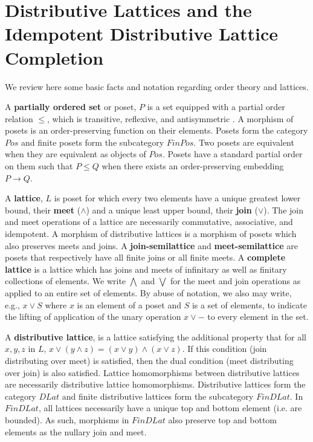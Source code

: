\documentclass[a4paper,USenglish,cleveref, autoref, thm-restate,authorcolumns]{lipics-v2019}
\begin{document}
\section{Distributive Lattices and the Idempotent Distributive Lattice Completion}

We review here some basic facts and notation regarding order theory and lattices.

A \textbf{partially ordered set} or poset, \(P\) is a set equipped with a partial order relation \(\le\), which is transitive, reflexive, and antisymmetric . A morphism of posets is an order-preserving function on their elements. Posets form the category \(Pos\) and finite posets form the subcategory \(FinPos\). Two posets are equivalent when they are equivalent as objects of \(Pos\). Posets have a standard partial order on them such that \(P \le Q\) when there exists an order-preserving embedding \(P \rightarrow Q\).

A \textbf{lattice}, \(L\) is poset for which every two elements have a unique greatest lower bound, their \textbf{meet} (\(\wedge\)) and a unique least upper bound, their \textbf{join} (\(\vee\)). The join and meet operations of a lattice are necessarily commutative, associative, and idempotent. A morphism of distributive lattices is a morphism of posets which also preserves meets and joins. A \textbf{join-semilattice} and \textbf{meet-semilattice} are posets that respectively have all finite joins or all finite meets. A \textbf{complete lattice} is a lattice which has joins and meets of infinitary as well as finitary collections of elements. We write \(\bigwedge\) and \(\bigvee\) for the meet and join operations as applied to an entire set of elements. By abuse of notation, we also may write, e.g., \(x \vee S\) where \(x\) is an element of a poset and \(S\) is a set of elements, to indicate the lifting of application of the unary operation \(x \vee -\) to every element in the set.

A \textbf{distributive lattice}, is a lattice satisfying the additional property that for all \(x, y, z\) in \(L\), \(x \vee (y \wedge z) = (x \vee y) \wedge (x \vee z)\). If this condition (join distributing over meet) is satisfied, then the dual condition (meet distributing over join) is also satisfied.  Lattice homomorphisms between distributive lattices are necessarily distributive lattice homomorphisms. Distributive lattices form the category \(DLat\) and finite distributive lattices form the subcategory \(FinDLat\). In \(FinDLat\), all lattices necessarily have a unique top and bottom element (i.e. are bounded). As such, morphisms in \(FinDLat\) also preserve top and bottom elements as the nullary join and meet.
\end{document}
